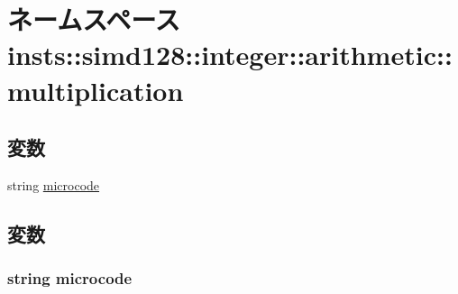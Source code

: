 \hypertarget{namespaceinsts_1_1simd128_1_1integer_1_1arithmetic_1_1multiplication}{
\section{ネームスペース insts::simd128::integer::arithmetic::multiplication}
\label{namespaceinsts_1_1simd128_1_1integer_1_1arithmetic_1_1multiplication}
}
\subsection*{変数}
\begin{DoxyCompactItemize}
\item 
string \hyperlink{namespaceinsts_1_1simd128_1_1integer_1_1arithmetic_1_1multiplication_a770f11a173e99389a8802f0107ed8f52}{microcode}
\end{DoxyCompactItemize}


\subsection{変数}
\hypertarget{namespaceinsts_1_1simd128_1_1integer_1_1arithmetic_1_1multiplication_a770f11a173e99389a8802f0107ed8f52}{
\subsubsection[{microcode}]{\setlength{\rightskip}{0pt plus 5cm}string {\bf microcode}}}
\label{namespaceinsts_1_1simd128_1_1integer_1_1arithmetic_1_1multiplication_a770f11a173e99389a8802f0107ed8f52}
